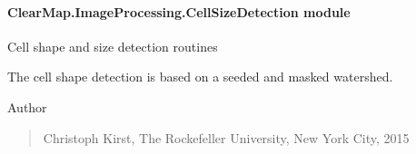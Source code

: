 \documentclass[letterpaper,10pt,english]{sphinxmanual}
\begin{document}
\paragraph{ClearMap.ImageProcessing.CellSizeDetection module}
\label{api/ClearMap.ImageProcessing:module-ClearMap.ImageProcessing.CellSizeDetection}\label{api/ClearMap.ImageProcessing:clearmap-imageprocessing-cellsizedetection-module}
Cell shape and size detection routines

The cell shape detection is based on a seeded and masked watershed.

Author
\begin{quote}

Christoph Kirst, The Rockefeller University, New York City, 2015
\end{quote}
\end{document}
